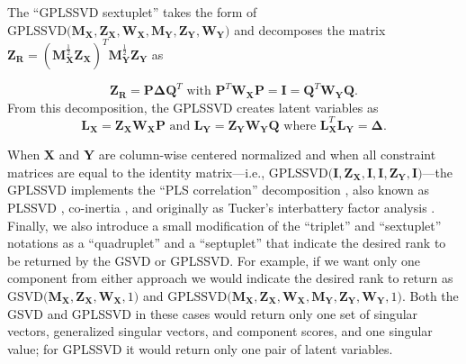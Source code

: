 \documentclass[12pt]{article}
\begin{document}
The ``GPLSSVD sextuplet'' takes the form of
\(\mathrm{GPLSSVD(} {\mathbf M}_{\mathbf X}, {\mathbf Z}_{\mathbf X}, {\mathbf W}_{\mathbf X}, {\mathbf M}_{\mathbf Y}, {\mathbf Z}_{\mathbf Y}, {\mathbf W}_{\mathbf Y} \mathrm{)}\)
and decomposes the matrix
\({\mathbf Z}_{\mathbf R} = ({\mathbf M}_{\mathbf X}^{\frac{1}{2}}{\mathbf Z}_{\mathbf X})^{T} {\mathbf M}_{\mathbf Y}^{\frac{1}{2}} {\mathbf Z}_{\mathbf Y}\)
as

\begin{equation}
{\mathbf Z}_{\mathbf R} = {\mathbf P} {\boldsymbol \Delta} {\mathbf Q}^{T}
\textrm{ with }
{\mathbf P}^{T}{\mathbf W}_{\mathbf X}{\mathbf P} = {\mathbf I} =
{\mathbf Q}^{T}{\mathbf W}_{\mathbf Y}{\mathbf Q}.
\end{equation} From this decomposition, the GPLSSVD creates latent
variables as \begin{equation}
{\mathbf L}_{\mathbf X} 
= {\mathbf Z}_{\mathbf X}{\mathbf W}_{\mathbf X}{\mathbf P} 
\textrm{ and } 
{\mathbf L}_{\mathbf Y} = 
{\mathbf Z}_{\mathbf Y}{\mathbf W}_{\mathbf Y}{\mathbf Q}
\textrm{ where }
{\mathbf L}_{\mathbf X}^{T} {\mathbf L}_{\mathbf Y} 
= {\boldsymbol \Delta}. 
\end{equation}

When \({\mathbf X}\) and \({\mathbf Y}\) are column-wise centered
normalized and when all constraint matrices are equal to the identity
matrix---i.e.,
\(\mathrm{GPLSSVD(} {\mathbf I}, {\mathbf Z}_{\mathbf X}, {\mathbf I}, {\mathbf I}, {\mathbf Z}_{\mathbf Y}, {\mathbf I} \mathrm{)}\)---the
GPLSSVD implements the ``PLS correlation'' decomposition
\citep{krishnan_partial_2011, bookstein1994partial, mcintosh_spatial_1996},
also known as PLSSVD \citep{tenenhaus_regression_1998}, co-inertia
\citep[\citet{dray2014}]{doledec1994}, and originally as Tucker's
interbattery factor analysis \citep{tucker_inter-battery_1958}. Finally,
we also introduce a small modification of the ``triplet'' and
``sextuplet'' notations as a ``quadruplet'' and a ``septuplet'' that
indicate the desired rank to be returned by the GSVD or GPLSSVD. For
example, if we want only one component from either approach we would
indicate the desired rank to return as
\(\mathrm{GSVD(} {\mathbf M}_{{\mathbf X}}, {\mathbf Z}_{\mathbf X}, {\mathbf W}_{{\mathbf X}}, 1 \mathrm{)}\)
and
\(\mathrm{GPLSSVD(} {\mathbf M}_{\mathbf X}, {\mathbf Z}_{\mathbf X}, {\mathbf W}_{\mathbf X}, {\mathbf M}_{\mathbf Y}, {\mathbf Z}_{\mathbf Y}, {\mathbf W}_{\mathbf Y}, 1 \mathrm{)}\).
Both the GSVD and GPLSSVD in these cases would return only one set of
singular vectors, generalized singular vectors, and component scores,
and one singular value; for GPLSSVD it would return only one pair of
latent variables.
\end{document}
